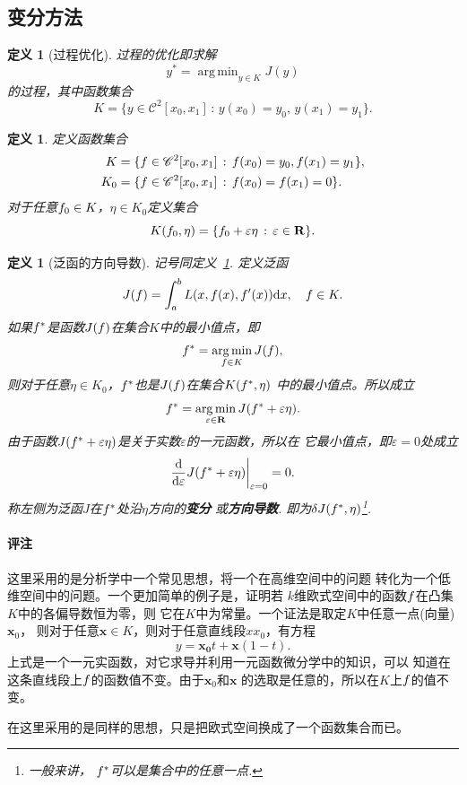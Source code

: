 \documentclass[12pt, a4paper]{article}
\theoremstyle{margin}
\newtheorem{defi}[thm]{定义}
\DeclareMathOperator*{\agm}{arg\,min}
\newcommand{\hp}{^\prime}
\newcommand{\ms}{\mathscr}
\newcommand{\tbf}{\textbf}
\newcommand{\mbf}{\mathbf}
\newcommand{\f}{\mathnormal{f}}
\newcommand{\R}{\mathbf{R}}
\newcommand{\rd}{\mathrm{d}}
\newcommand{\vep}{\varepsilon}
\newcommand\defref[1]{定义~\ref{#1}}
\newcommand{\remark}{\paragraph{评注}}
\begin{document}
\newpage
\subsection{变分方法}
  \begin{defi}[过程优化]
    \label{def: 过程优化}
    过程的优化即求解
    \[
      \label{equ: 过程优化}
      y^* = \agm_{y\in K}J(y)
    \]
    的过程，其中函数集合
    \[
      K = \{y\in\ms{C}^2[x_0, x_1]\,:\, y(x_0)=y_0,\,y(x_1)=y_1\}.
    \]
  \end{defi}

  \begin{defi}
    \label{defi: K}
    定义函数集合
    \[\begin{split}
      K &= \{\f\in\ms{C}^2[x_0, x_1]\,:\,\f(x_0)=y_0,
      \f(x_1) = y_1\}, \\
      K_0 &=\{\f\in\ms{C}^2[x_0, x_1]\,:\,\f(x_0)=
      \f(x_1) = 0\}.
    \end{split}\]
    对于任意$\f_0\in K$，$\eta \in K_0$定义集合
    \[
      K(\f_0, \eta) = \{\f_0 + \vep\eta\,:\,\vep\in\R\}.
    \]
  \end{defi}

  \begin{defi}[泛函的方向导数]
    \label{def: 泛函的方向导数}
    记号同\defref{defi: K}. 定义泛函
    \[
      J(\f) = \int_a^bL(x, \f(x), \f\hp(x)) \rd x,\quad
      \f \in K.
    \]
    如果$\f^*$是函数$J(\f)$在集合$K$中的最小值点，即
    \[
      \f^* = \agm_{\f\in K}J(\f),
    \]
    则对于任意$\eta\in K_0$，$\f^*$也是$J(\f)$在集合$K(\f^*,\eta)$
    中的最小值点。所以成立
    \[
      \f^* = \agm_{\vep\in\R}J(\f^* + \vep\eta).
    \]
    由于函数$J(\f^* + \vep\eta)$是关于实数$\vep$的一元函数，所以在
    它最小值点，即$\vep =0$处成立
    \begin{equation}
      \label{equ: 方向导数为零}
      \frac{\rd}{\rd\vep}J(\f^* + \vep\eta)\bigg|_{\vep =0}=0.
    \end{equation}
    称左侧为泛函$J$在$\f^*$处沿$\eta$方向的\tbf{变分}
    或\tbf{方向导数}. 即为$\delta J(\f^*, \eta)$\footnote{一般来讲，
    $\f^*$可以是集合中的任意一点. }.
  \end{defi}
  \remark
    这里采用的是分析学中一个常见思想，将一个在高维空间中的问题
    转化为一个低维空间中的问题。一个更加简单的例子是，证明若
    $k$维欧式空间中的函数$\f$在凸集$K$中的各偏导数恒为零，则
    它在$K$中为常量。一个证法是取定$K$中任意一点(向量)$\mbf{x}_0$，
    则对于任意$\mbf{x}\in K$，则对于任意直线段$xx_0$，有方程
    \[
      y = \mbf{x_0}t + \mbf{x}(1-t).
    \]
    上式是一个一元实函数，对它求导并利用一元函数微分学中的知识，可以
    知道在这条直线段上$\f$的函数值不变。由于$\mbf{x}_0$和$\mbf{x}$
    的选取是任意的，所以在$K$上$\f$的值不变。\par
    在这里采用的是同样的思想，只是把欧式空间换成了一个函数集合而已。
\end{document}
